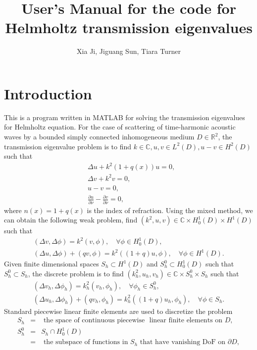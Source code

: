 \documentclass[12pt]{article}%
\numberwithin{equation}{section}
\numberwithin{remark}{section}
\numberwithin{example}{section}
\begin{document}
 \title{User's Manual for the code for Helmholtz transmission eigenvalues}
 \author{Xia Ji, Jiguang Sun, Tiara Turner}
 \maketitle

\section{Introduction}
This is a program written in MATLAB for solving the transmission eigenvalues for Helmholtz equation. For the case
of scattering of time-harmonic acoustic waves by a bounded simply connected inhomogeneous
medium $D\in \mathbb{R}^2$, the transmission eigenvalue problem is to find $k\in \mathbb{C}, u,v \in L^2(D), u-v
\in H^2(D)$ such that
\begin{eqnarray*}
&\Delta u+k^2(1+q(x))u=0,\\
&\Delta v+k^2 v=0,\\
&u-v=0,\\
&\frac{\partial u}{\partial \nu}-\frac{\partial v}{\partial \nu}=0,
\end{eqnarray*}
where $n(x)=1+q(x)$ is the index of refraction. Using the mixed method, we can obtain the following weak problem, find $(k^2,u,v)\in \mathbb{C}\times H^1_0(D)\times H^1(D)$ such that
\begin{eqnarray*}
(\Delta v,\Delta \phi)=k^2(v,\phi),\quad \forall \phi \in H_0^1(D),\\
(\Delta u,\Delta \phi)+(qv,\phi)=k^2((1+q)u,\phi),
\quad  \forall \phi\in H^1(D).
\end{eqnarray*}
Given finite dimensional spaces $S_h \subset H^1(D)$ and $S_h^0\subset H_0^1(D)$ such that
$S_h^0\subset S_h$, the discrete problem is to find $(k_h^2,u_h,v_h)\in \mathbb{C}\times S_h^0\times S_h$ such that
\begin{eqnarray*}
(\Delta v_h,\Delta \phi_h)=k_h^2(v_h,\phi_h),\quad \forall \phi_h \in S_h^0,\\
(\Delta u_h,\Delta \phi_h)+(qv_h,\phi_h)=k_h^2((1+q)u_h,\phi_h),
\quad  \forall \phi\in S_h.
\end{eqnarray*}
Standard piecewise linear finite elements  are used to discretize the
problem
\begin{eqnarray*}
S_h&=&\mbox{ the space of continuous piecewise } \mbox{ linear finite elements on }D,\\
S_{h}^{0}&=&S_h\cap H_0^1(D)\\
&=&  \mbox{ the subspace of functions in } S_h \mbox{ that have vanishing DoF  on }\partial D,
\end{eqnarray*}
\end{document}
